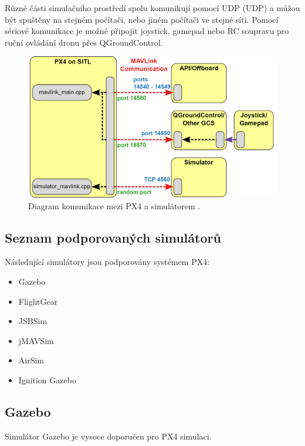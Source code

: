 Různé části simulačního prostředí spolu komunikují pomocí \acs{UDP} (\acl{UDP}) a můžou být spuštěny na stejném počítači, nebo jiném počítači ve stejné síti. Pomocí sériové komunikace je možné připojit joystick, gamepad nebo RC soupravu pro ruční ovládání dronu přes QGroundControl.

\begin{figure}[!ht]
  \begin{center}
    \includegraphics[scale=0.3]{obrazky/SIM2}
  \end{center}
  \caption[Diagram komunikace mezi PX4 a simulátorem]{Diagram komunikace mezi PX4 a simulátorem \cite{SIM}.}
  \label{fig:SIM2}
\end{figure}

\subsection{Seznam podporovaných simulátorů}

Následující simulátory jsou podporovány systémem PX4:

\begin{itemize}
    \item Gazebo
    \item FlightGear
    \item JSBSim
    \item jMAVSim
    \item AirSim
    \item Ignition Gazebo
\end{itemize}

\subsection{Gazebo}

Simulátor Gazebo je vysoce doporučen pro PX4 simulaci.

